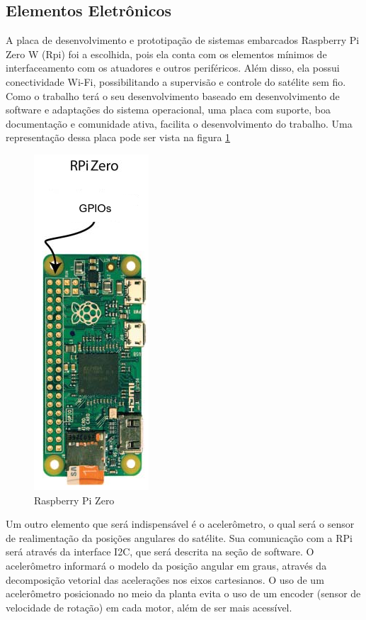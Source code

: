 
\subsection{Elementos Eletrônicos}

A placa de desenvolvimento e prototipação de sistemas embarcados Raspberry Pi Zero W (Rpi) foi a escolhida, pois ela conta com os elementos mínimos de interfaceamento com os atuadores e outros periféricos. Além disso, ela possui conectividade Wi-Fi, possibilitando a supervisão e controle do satélite sem fio. Como o trabalho terá o seu desenvolvimento baseado em desenvolvimento de software e adaptações do sistema operacional, uma placa com suporte, boa documentação e comunidade ativa, facilita o desenvolvimento do trabalho. Uma representação dessa placa pode ser vista na figura \ref{fig:rasp_zero}

\begin{figure}[H]
  \caption{Raspberry Pi Zero}
  \begin{center}
      \includegraphics[scale=.55]{img/rasp_zero}
  \end{center}
  \label{fig:rasp_zero}
\end{figure}

Um outro elemento que será indispensável é o acelerômetro, o qual será o sensor de realimentação da posições angulares do satélite. Sua comunicação com a RPi será através da interface I2C, que será descrita na seção de software. O acelerômetro informará o modelo da posição angular em graus, através da decomposição vetorial das acelerações nos eixos cartesianos. O uso de um acelerômetro posicionado no meio da planta evita o uso de um encoder (sensor de velocidade de rotação) em cada motor, além de ser mais acessível.

